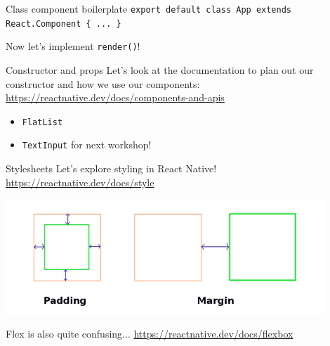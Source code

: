 \documentclass{beamer}
\begin{document}
\begin{frame}{Class component boilerplate}
	\texttt{export default class App extends React.Component \{ ... \}}\pause

	\bigskip

	Now let's implement \texttt{render()}!
\end{frame}

\begin{frame}{Constructor and props}
	Let's look at the documentation to plan out our constructor and how we use our components: \href{https://reactnative.dev/docs/components-and-apis}{https://reactnative.dev/docs/components-and-apis}

	\bigskip\pause

	\begin{itemize}
		\item \texttt{FlatList} \pause
		\item \texttt{TextInput} for next workshop!
	\end{itemize}
\end{frame}

\begin{frame}{Stylesheets}
	Let's explore styling in React Native! \href{https://reactnative.dev/docs/style}{https://reactnative.dev/docs/style} \pause

	\bigskip

	\includegraphics[width=0.9\textwidth]{figs/padding-margin.png}

	\pause\bigskip

	Flex is also quite confusing... \href{https://reactnative.dev/docs/flexbox}{https://reactnative.dev/docs/flexbox}
\end{frame}
\end{document}
